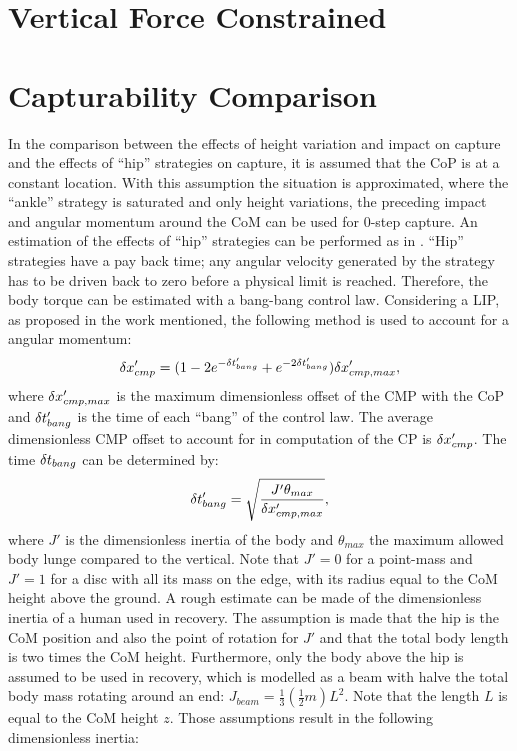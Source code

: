 \section{Vertical Force Constrained}

\section{Capturability Comparison}
In the comparison between the effects of height variation and impact on capture and the effects of ``hip'' strategies on capture, it is assumed that the \ac{CoP} is at a constant location. With this assumption the situation is approximated, where the ``ankle'' strategy is saturated and only height variations, the preceding impact and angular momentum around the \ac{CoM} can be used for 0-step capture.
\paraskip
An estimation of the effects of ``hip'' strategies can be performed as in \cite{pratt2006capture, stephens2007humanoid, koolen2012capturability}. ``Hip'' strategies have a pay back time; any angular velocity generated by the strategy has to be driven back to zero before a physical limit is reached. Therefore, the body torque can be estimated with a bang-bang control law.  Considering a \ac{LIP}, as proposed in the work mentioned, the following method is used to account for a angular momentum:
\begin{equation}
\delta x_{cmp}' = (1-2e^{-\delta t_{bang}'}+e^{-2\delta t_{bang}'})\delta x_{cmp,max}',
\end{equation}
where $\delta x_{cmp,max}'$ is the maximum dimensionless offset of the \ac{CMP} with the \ac{CoP} and $\delta t_{bang}'$ is the time of each ``bang'' of the control law. The average dimensionless \ac{CMP} offset to account for in computation of the \ac{CP} is $\delta x_{cmp}'$. The time $\delta t_{bang}$ can be determined by:
\begin{equation}
\delta t_{bang}' = \sqrt{\frac{J'\theta_{max}}{\delta x_{cmp,max}'}},
\end{equation}
where $J'$ is the dimensionless inertia of the body and $\theta_{max}$ the maximum allowed body lunge compared to the vertical. Note that $J'=0$ for a point-mass and $J'=1$ for a disc with all its mass on the edge, with its radius equal to the \ac{CoM} height above the ground. 
\paraskip
A rough estimate can be made of the dimensionless inertia of a human used in recovery. The assumption is made that the hip is the \ac{CoM} position and also the point of rotation for $J'$ and that the total body length is two times the \ac{CoM} height. Furthermore, only the body above the hip is assumed to be used in recovery, which is modelled as a beam with halve the total body mass rotating around an end: $J_{beam} = \frac{1}{3}(\frac{1}{2}m)L^2$. Note that the length $L$ is equal to the \ac{CoM} height $z$. Those assumptions result in the following dimensionless inertia:
